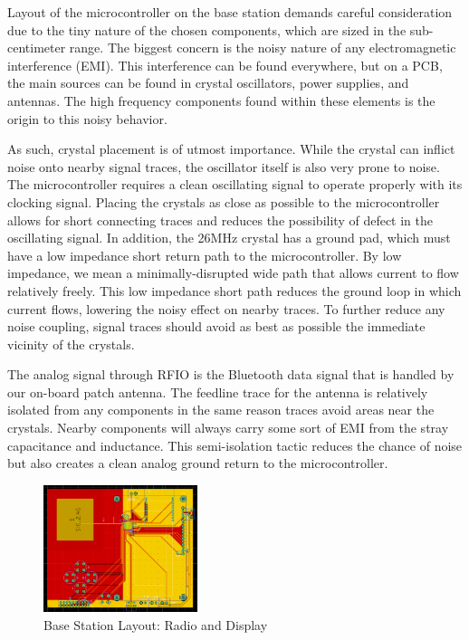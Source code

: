\documentclass[journal,compsoc]{IEEEtran}
\begin{document}
Layout of the microcontroller on the base station demands careful consideration due to the tiny nature of the chosen components, which are sized in the sub-centimeter range. The biggest concern is the noisy nature of any electromagnetic interference (EMI). This interference can be found everywhere, but on a PCB, the main sources can be found in crystal oscillators, power supplies, and antennas. The high frequency components found within these elements is the origin to this noisy behavior.

As such, crystal placement is of utmost importance. While the crystal can inflict noise onto nearby signal traces, the oscillator itself is also very prone to noise. The microcontroller requires a clean oscillating signal to operate properly with its clocking signal. Placing the crystals as close as possible to the microcontroller allows for short connecting traces and reduces the possibility of defect in the oscillating signal. In addition, the 26MHz crystal has a ground pad, which must have a low impedance short return path to the microcontroller. By low impedance, we mean a minimally-disrupted wide path that allows current to flow relatively freely. This low impedance short path reduces the ground loop in which current flows, lowering the noisy effect on nearby traces. To further reduce any noise coupling, signal traces should avoid as best as possible the immediate vicinity of the crystals.

The analog signal through RFIO is the Bluetooth data signal that is handled by our on-board patch antenna. The feedline trace for the antenna is relatively isolated from any components in the same reason traces avoid areas near the crystals. Nearby components will always carry some sort of EMI from the stray capacitance and inductance. This semi-isolation tactic reduces the chance of noise but also creates a clean analog ground return to the microcontroller.

\begin{figure}[ht] 	%
\centering
\includegraphics[width=0.4\textwidth]{base-layout-full.PNG}
\caption{ \space Base Station Layout: Radio and Display}
\label{base-lay-full}
\end{figure}
\end{document}
